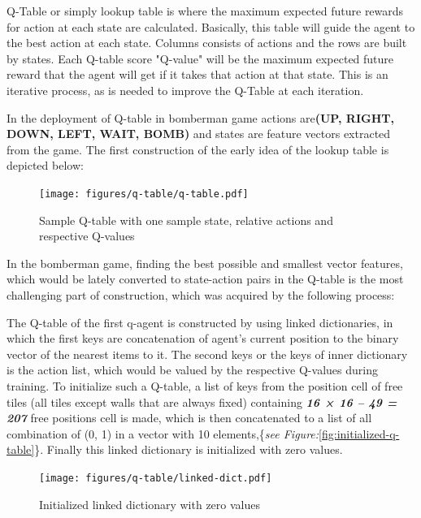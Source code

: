 \documentclass{article}
\begin{document}
Q-Table or simply lookup table \cite{Reinforecement-Learning} is where the maximum expected future rewards for action at each state are calculated. Basically, this table will guide the agent to the best action at each state. Columns consists of actions and the rows are built by states. Each Q-table score "Q-value" will be the maximum expected future reward that the agent will get if it takes that action at that state. This is an iterative process, as is needed to improve the Q-Table at each iteration.


 In the deployment of Q-table in bomberman game actions are\textbf{(UP, RIGHT, DOWN, LEFT, WAIT, BOMB)} and states are feature vectors extracted from the game. The first construction of the early idea of the lookup table is depicted below:
 

\begin{figure}[h]
    \centering
    \texttt{[image: figures/q-table/q-table.pdf]}
    \caption{Sample Q-table with one sample state, relative actions and respective Q-values}
    \label{fig:early-q-table}
\end{figure}



In the bomberman game, finding the best possible and smallest vector features, which would be lately converted to state-action pairs in the Q-table is the most challenging part of construction, which was acquired by the following process:

The Q-table of the first q-agent is constructed by using linked dictionaries, in which the first keys are concatenation of agent's current position to the binary vector of the nearest items to it. The second keys or the keys of inner dictionary is the action list, which would be valued by the respective Q-values during training. To initialize such a Q-table, a list of keys from the position cell of free tiles (all tiles except walls that are always fixed) containing \textbf{\textit{16 × 16 – 49 = 207}} free positions cell is made, which is then concatenated to a list of all combination of (0, 1) in a vector with 10 elements,\{\textit{see Figure:}\ref{fig:initialized-q-table}\}. Finally this linked dictionary is initialized with zero values.

\begin{figure}[h]
    \centering
    \texttt{[image: figures/q-table/linked-dict.pdf]}
    \caption{Initialized linked dictionary with zero values }
    \label{fig:linked-dict}
\end{figure}
\end{document}
